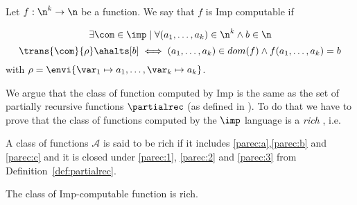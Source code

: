
\begin{definition}
  Let \(f : \n^k \to \n\) be a function. We say that \(f\) is Imp
  computable if

  \[\exists \com \in\imp \mid \forall (a_1, \dots, a_k) \in \n^k \wedge
  b \in \n \] \[\trans{\com}{\rho} \ahalts[b] \iff (a_1, \dots, a_k)
  \in dom(f) \wedge f(a_1,\dots,a_k) = b\] with \(\rho = \envi{\var_1
    \mapsto a_1, \dots, \var_k \mapsto a_k}\).
\end{definition}

We argue that the class of function computed by Imp is the same as the
set of partially recursive functions \(\partialrec\) (as defined in
\cite{cutland1980computability}). To do that we have to prove that the
class of functions computed by the \(\imp\) language is a \emph{rich}
, i.e.

\begin{definition}
  A class of functions \(\mathcal{A}\) is said to be rich if it
  includes \ref{parec:a},\ref{parec:b} and \ref{parec:c} and it is
  closed under \ref{parec:1}, \ref{parec:2} and \ref{parec:3} from
  Definition~\ref{def:partialrec}.
\end{definition}

\begin{lemma}
  The class of Imp-computable function is rich.
\end{lemma}

